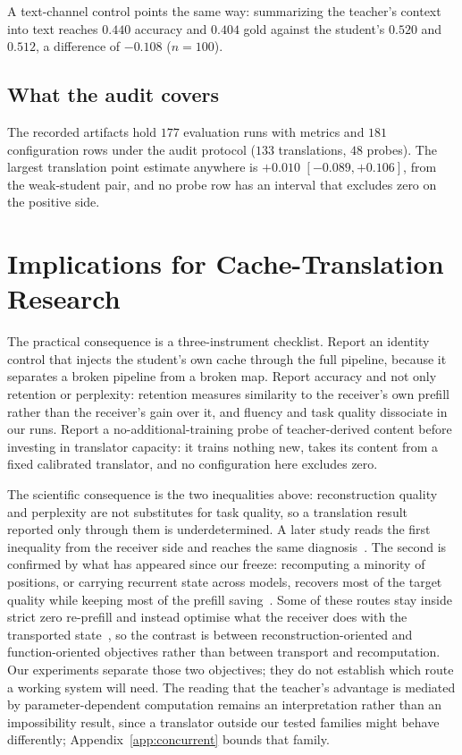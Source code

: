 \documentclass[10pt]{article}
\begin{document}
A text-channel control points the same way: summarizing the teacher's context
into text reaches $0.440$ accuracy and $0.404$ gold against the student's $0.520$
and $0.512$, a difference of $-0.108$ ($n{=}100$).

\subsection{What the audit covers}
The recorded artifacts hold $177$ evaluation runs with metrics and $181$
configuration rows under the audit protocol ($133$ translations, $48$ probes).
The largest translation point estimate anywhere is $+0.010$
$[-0.089,+0.106]$, from the weak-student pair, and no probe row has an interval
that excludes zero on the positive side.


\section{Implications for Cache-Translation Research}
\label{sec:implications}

The practical consequence is a three-instrument checklist. Report an identity
control that injects the student's own cache through the full pipeline, because
it separates a broken pipeline from a broken map. Report accuracy and not only
retention or perplexity: retention measures similarity to the receiver's own
prefill rather than the receiver's gain over it, and fluency and task quality
dissociate in our runs. Report a no-additional-training probe of teacher-derived
content before investing in translator capacity: it trains nothing new, takes
its content from a fixed calibrated translator, and no configuration here
excludes zero.

The scientific consequence is the two inequalities above: reconstruction quality
and perplexity are not substitutes for task quality, so a translation result
reported only through them is underdetermined. A later study reads the first
inequality from the receiver side and reaches the same
diagnosis~\citep{cachelink2026}. The second is confirmed by what has appeared
since our freeze: recomputing a minority of positions, or carrying recurrent
state across models, recovers most of the target quality while keeping most of
the prefill saving~\citep{raracache2026,acct2026,latentport2026}. Some of these
routes stay inside strict zero re-prefill and instead optimise what the receiver
does with the transported state~\citep{cachelink2026,kvlingo2026}, so the
contrast is between reconstruction-oriented and function-oriented objectives
rather than between transport and recomputation. Our experiments separate those
two objectives; they do not establish which route a working system will need.
The reading that the teacher's advantage is mediated by
parameter-dependent computation remains an interpretation rather than an
impossibility result, since a translator outside our tested families might
behave differently; Appendix~\ref{app:concurrent} bounds that family.
\end{document}

